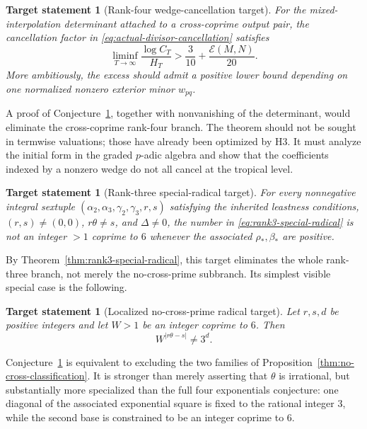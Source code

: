 \documentclass[11pt,oneside]{article}
\theoremstyle{research}
\newtheorem{conjecture}[theorem]{Target statement}
\theoremstyle{definition}
\newcommand{\E}{\mathcal E}
\begin{document}
\begin{conjecture}[Rank-four wedge-cancellation target]
\label{conj:wedge-cancellation-target}
For the mixed-interpolation determinant attached to a cross-coprime output
pair, the cancellation factor in \eqref{eq:actual-divisor-cancellation}
satisfies
\begin{equation}
 \liminf_{T\to\infty}\frac{\log C_T}{H_T}
 >\frac3{10}+\frac{\E(M,N)}{20}.
 \label{eq:wedge-cancellation-target}
\end{equation}
More ambitiously, the excess should admit a positive lower bound depending on
one normalized nonzero exterior minor $w_{pq}$.
\end{conjecture}

A proof of Conjecture~\ref{conj:wedge-cancellation-target}, together with
nonvanishing of the determinant, would eliminate the cross-coprime rank-four
branch.  The theorem should not be sought in termwise valuations; those have
already been optimized by H3.  It must analyze the initial form in the graded
$p$-adic algebra and show that the coefficients indexed by a nonzero wedge do
not all cancel at the tropical level.

\begin{conjecture}[Rank-three special-radical target]
\label{conj:rank3-radical-target}
For every nonnegative integral sextuple
$(\alpha_2,\alpha_3,\gamma_2,\gamma_3,r,s)$ satisfying the inherited
leastness conditions, $(r,s)\ne(0,0)$, $r\theta\ne s$, and $\Delta\ne0$, the
number in \eqref{eq:rank3-special-radical} is not an integer $>1$ coprime to
$6$ whenever the associated $\rho_*,\beta_*$ are positive.
\end{conjecture}

By Theorem~\ref{thm:rank3-special-radical}, this target eliminates the whole
rank-three branch, not merely the no-cross-prime subbranch.  Its simplest
visible special case is the following.

\begin{conjecture}[Localized no-cross-prime radical target]
\label{conj:localized-radical-target}
Let $r,s,d$ be positive integers and let $W>1$ be an integer coprime to $6$.
Then
\begin{equation}
 W^{|r\theta-s|}\ne3^d.
 \label{eq:localized-radical-target}
\end{equation}
\end{conjecture}

Conjecture~\ref{conj:localized-radical-target} is equivalent to excluding the
two families of Proposition~\ref{thm:no-cross-classification}.  It is stronger
than merely asserting that $\theta$ is irrational, but substantially more
specialized than the full four exponentials conjecture: one diagonal of the
associated exponential square is fixed to the rational integer $3$, while the
second base is constrained to be an integer coprime to $6$.
\end{document}
